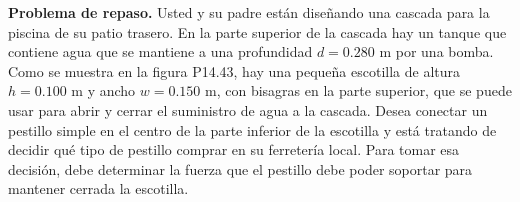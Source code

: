\item \textbf{Problema de repaso.} Usted y su padre están diseñando una cascada para la piscina de su patio trasero. En la parte superior de la cascada hay un tanque que contiene agua que se mantiene a una profundidad $d = 0.280 \text{ m}$ por una bomba. Como se muestra en la figura P14.43, hay una pequeña escotilla de altura $h = 0.100 \text{ m}$ y ancho $w = 0.150 \text{ m}$, con bisagras en la parte superior, que se puede usar para abrir y cerrar el suministro de agua a la cascada. Desea conectar un pestillo simple en el centro de la parte inferior de la escotilla y está tratando de decidir qué tipo de pestillo comprar en su ferretería local. Para tomar esa decisión, debe determinar la fuerza que el pestillo debe poder soportar para mantener cerrada la escotilla.
